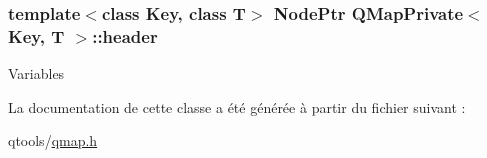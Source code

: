 \subsubsection[{header}]{\setlength{\rightskip}{0pt plus 5cm}template$<$class Key, class T$>$ {\bf Node\+Ptr} {\bf Q\+Map\+Private}$<$ Key, T $>$\+::header\hspace{0.3cm}{\ttfamily [protected]}}\label{class_q_map_private_a68a9e07ff34146b090cbac239851139e}
Variables 

La documentation de cette classe a été générée à partir du fichier suivant \+:\begin{DoxyCompactItemize}
\item 
qtools/\hyperlink{qmap_8h}{qmap.\+h}\end{DoxyCompactItemize}
